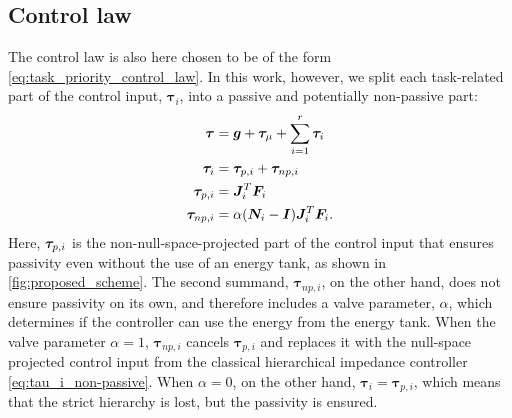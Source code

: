 \documentclass[../main.tex]{subfiles}
\begin{document}
\subsection{Control law}
The control law is also here chosen to be of the form \eqref{eq:task_priority_control_law}. In this work, however, we 
split each task-related part of the control input, $\bm{\tau}_{i}$, into a passive and potentially non-passive part:
\begin{subequations} \label{eq:tau_i_full}
    \begin{align}
        \bm{\tau}        &= \bm{g}+\bm{\tau}_{\mu}+\sum_{i=1}^r \bm{\tau}_{i} \\
        \bm{\tau}_{i}    &= \bm{\tau}_{p,i} + \bm{\tau}_{np,i} \label{eq:tau_i} \\
        \bm{\tau_}{p,i}  &= \bm{J}_{i}^T\bm{F}_{i} \label{eq:tau_pi} \\
        \bm{\tau_}{np,i} & = \alpha (\bm{N}_{i}-\bm{I}) \bm{J}_{i}^T\bm{F}_{i}. \label{eq:tau_npi}
    \end{align}
\end{subequations}
Here, $\bm{\tau_}{p,i}$ is the non-null-space-projected part of the control input that ensures passivity even without the use of an energy tank, as shown in \cref{fig:proposed_scheme}. The second summand, $\bm{\tau}_{np,i}$, on the other hand, does not ensure passivity on its own, and therefore includes a valve parameter, $\alpha$, which determines if the controller can use the energy from the energy tank. When the valve parameter $\alpha=1$, $\bm{\tau}_{np,i}$ cancels $\bm{\tau}_{p,i}$ and replaces it with the null-space projected control input from the classical hierarchical impedance controller \eqref{eq:tau_i_non-passive}. When $\alpha = 0$, on the other hand, $\bm{\tau}_i = \bm{\tau}_{p,i}$, which means that the strict hierarchy is lost, but the passivity is ensured. 

\end{document}
